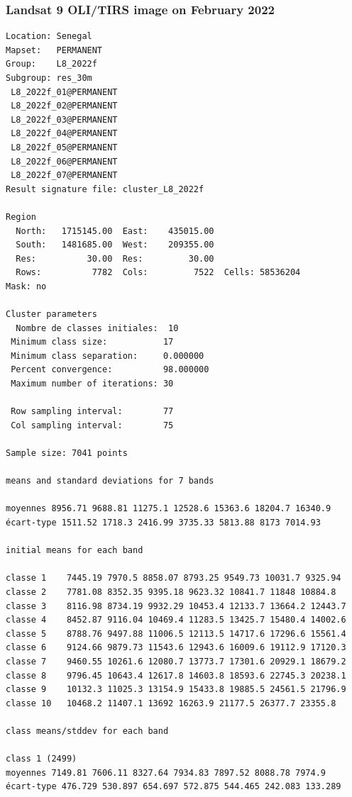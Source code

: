 \documentclass[earth,article,submit,pdftex,moreauthors]{Definitions/mdpi}
\begin{document}
\subsubsection[\appendixname~\thesubsubsection]{Landsat 9 OLI/TIRS image on February 2022}
\begin{scriptsize}
\begin{verbatim}
Location: Senegal
Mapset:   PERMANENT
Group:    L8_2022f
Subgroup: res_30m
 L8_2022f_01@PERMANENT
 L8_2022f_02@PERMANENT
 L8_2022f_03@PERMANENT
 L8_2022f_04@PERMANENT
 L8_2022f_05@PERMANENT
 L8_2022f_06@PERMANENT
 L8_2022f_07@PERMANENT
Result signature file: cluster_L8_2022f

Region
  North:   1715145.00  East:    435015.00
  South:   1481685.00  West:    209355.00
  Res:          30.00  Res:         30.00
  Rows:          7782  Cols:         7522  Cells: 58536204
Mask: no

Cluster parameters
  Nombre de classes initiales: 	10
 Minimum class size:           17
 Minimum class separation:     0.000000
 Percent convergence:          98.000000
 Maximum number of iterations: 30

 Row sampling interval:        77
 Col sampling interval:        75

Sample size: 7041 points

means and standard deviations for 7 bands

moyennes 8956.71 9688.81 11275.1 12528.6 15363.6 18204.7 16340.9
écart-type 1511.52 1718.3 2416.99 3735.33 5813.88 8173 7014.93

initial means for each band

classe 1    7445.19 7970.5 8858.07 8793.25 9549.73 10031.7 9325.94
classe 2    7781.08 8352.35 9395.18 9623.32 10841.7 11848 10884.8
classe 3    8116.98 8734.19 9932.29 10453.4 12133.7 13664.2 12443.7
classe 4    8452.87 9116.04 10469.4 11283.5 13425.7 15480.4 14002.6
classe 5    8788.76 9497.88 11006.5 12113.5 14717.6 17296.6 15561.4
classe 6    9124.66 9879.73 11543.6 12943.6 16009.6 19112.9 17120.3
classe 7    9460.55 10261.6 12080.7 13773.7 17301.6 20929.1 18679.2
classe 8    9796.45 10643.4 12617.8 14603.8 18593.6 22745.3 20238.1
classe 9    10132.3 11025.3 13154.9 15433.8 19885.5 24561.5 21796.9
classe 10   10468.2 11407.1 13692 16263.9 21177.5 26377.7 23355.8

class means/stddev for each band

class 1 (2499)
moyennes 7149.81 7606.11 8327.64 7934.83 7897.52 8088.78 7974.9
écart-type 476.729 530.897 654.697 572.875 544.465 242.083 133.289


\end{verbatim}
\end{scriptsize}
\end{document}
